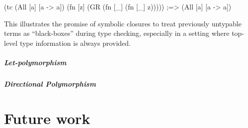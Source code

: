 \documentclass[11pt]{iuthesis}
\begin{document}
\begin{cljlisting}
(tc (All [a] [a -> a])
    (fn [z]
      (GR (fn [_] (fn [_] z)))))
;=> (All [a] [a -> a])
\end{cljlisting}

This illustrates the promise of symbolic closures to treat previously untypable terms
as ``black-boxes'' during type checking, especially in a setting where top-level
type information is always provided.

\paragraph{Let-polymorphism}

%

\paragraph{Directional Polymorphism}

%





\chapter{Future work}
\end{document}
